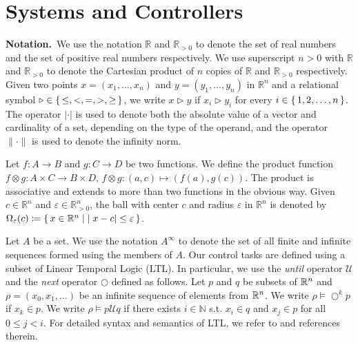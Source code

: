 
\section{Systems and Controllers}

\smallskip
\noindent\textbf{Notation.}\
We use the notation $\mathbb{R}$ and $\mathbb{R}_{>0}$ to denote the set of real numbers and the set of positive real numbers respectively.
We use superscript $n>0$ with $\mathbb{R}$ and $\mathbb{R}_{>0}$ to denote the Cartesian product of $n$ copies of $\mathbb{R}$ and $\mathbb{R}_{>0}$ respectively.
Given two points $x=(x_1,\ldots, x_n)$ and $y=(y_1,\ldots, y_n)$ in $ \mathbb{R}^n$
and a relational symbol $\triangleright\in \set{\leq, <, = , >, \geq}$, we write $x\triangleright y$ if $x_i\triangleright y_i$ for every $i\in\set{1,2,\ldots,n}$.
The operator $|\cdot |$ is used to denote both the absolute value of a vector and cardinality of a set, depending on the type of the operand, and the operator $\| \cdot \|$ is used to denote the infinity norm.  

Let $f\colon A\to B$ and $g\colon C\to D$ be two functions.
We define the product function $f\otimes g\colon A\times C\to B\times D $, $f\otimes g \colon (a,c)\mapsto (f(a),g(c))$.
The product is associative and extends to more than two functions in the obvious way.
%
Given $c\in \mathbb{R}^n$ and $\varepsilon\in \mathbb{R}_{>0}^{n}$, the ball with center $c$ and radius $\varepsilon$ in $\mathbb{R}^n$ is denoted by 
$\Omega_\varepsilon(c)\coloneqq \set{x \in \mathbb{R}^n \mid  |x-c|\leq \varepsilon }$.

Let $A$ be a set.
We use the notation $A^\infty$ to denote the set of all finite and infinite sequences formed using the members of $A$. Our control tasks are defined using a subset of Linear Temporal Logic (LTL). 
In particular, we use the \emph{until} operator $\mathcal{U}$ and the \emph{next} operator $\bigcirc$ defined as follows. 
Let $p$ and $q$ be subsets of $\mathbb{R}^n$ and $\rho=(x_0,x_1,\dots)$ be an infinite sequence of elements from $\mathbb{R}^n$. 
We write $\rho\models\bigcirc^k p$ if $x_k\in p$. We write $\rho\models p\mathcal{U}q$ if there exists 
$i\in\mathbb{N}$ s.t. $x_i\in q$ and $x_j\in p$ for all $0\leq j<i$. 
For detailed syntax and semantics of LTL, we refer to \cite{baier2008principles} and references therein.

